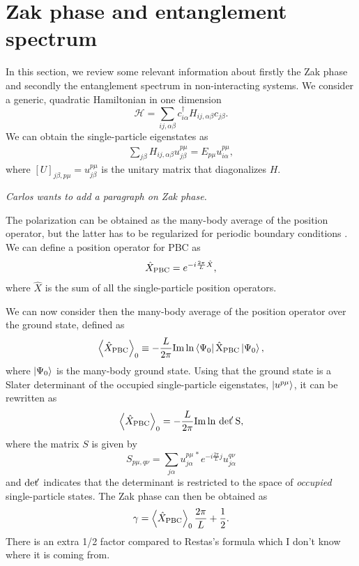 \documentclass[twocolumn,amsmath,longbibliography,amssymb,superscriptaddress]{revtex4-1}
\newcommand{\carlos}[1]{{\color{red} #1}}
\newcommand{\mariac}[1]{{\it\color{cyan}#1}}
\begin{document}
\section{Zak phase and entanglement spectrum}
In this section, we review some relevant information about firstly the Zak phase and secondly the entanglement spectrum in non-interacting systems. 
We consider a generic, quadratic Hamiltonian in one dimension
\begin{equation}\label{eq:quadr_Ham}
\mathcal{H} = \sum_{ij,\alpha\beta} c_{i\alpha}^\dagger H_{ij,\alpha \beta}c_{j\beta}.
\end{equation}
We can obtain the single-particle eigenstates as
\begin{align}
\sum_{j\beta}H_{ij,\alpha\beta} u^{p\mu}_{j\beta} = E_{p\mu} u_{i\alpha}^{p\mu},
\end{align}
where $[U]_{j\beta,p\mu} = u^{p\mu}_{j\beta}$ is the unitary matrix that diagonalizes $H$. 


\mariac{Carlos wants to add a paragraph on Zak phase. }

The polarization can be obtained as the many-body average of the position operator, but the latter has to be regularized for periodic boundary conditions \cite{Resta1997}. 
We can define a position operator for PBC as
\begin{equation}
\hat{X}_{\rm PBC} = e^{-i\frac{2\pi}{L}\hat{X}},
\end{equation}
where $\hat{X}$ is the sum of all the single-particle position operators. 

We can now consider then the many-body average of the position operator over the ground state, defined as
\begin{align}
\expval{\hat{X}_{\rm PBC}}_0 \equiv -\frac{L}{2\pi} \rm{ Im }\ln\bra{\Psi_0}\hat{X}_{\rm PBC}\ket{\Psi_0},
\end{align}
where $\ket{\Psi_0}$ is the many-body ground state. 
Using that the ground state is a Slater determinant of the occupied single-particle eigenstates, $\ket{u^{p\mu}}$, it can be rewritten as~\cite{Resta1997}
\begin{align}
\expval{\hat{X}_{\rm PBC}}_0 = -\frac{L}{2\pi} \rm{Im }\ln \, {\rm det }\!' \, S,
\end{align}
where the matrix $S$ is given by
\begin{equation}
S_{p\mu,q\nu} = \sum_{j\alpha} u^{p\mu\, \ast}_{j \alpha} e^{-i\frac{2\pi}{L}j}u^{q\nu}_{j \alpha}
\end{equation}
and  ${\rm det }\!' $ indicates that the determinant is restricted to the space of \emph{occupied} single-particle states. 
The Zak phase can then be obtained as
\begin{equation}
\gamma = \expval{\hat{X}_{\rm PBC}}_0\frac{2\pi}{L} + \frac{1}{2}.
\end{equation}
\carlos{There is an extra 1/2 factor compared to Restas's formula which I don't know where it is coming from.}
\end{document}
